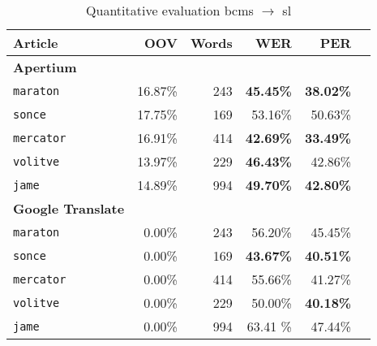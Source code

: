 \begin{table}
\begin{tabular}{lrrrrr}

\textbf{Article} & \textbf{OOV} & \textbf{Words} & \textbf{WER} & \textbf{PER}\\
\hline
\textbf{Apertium} & & & & \\
\hline
\texttt{maraton} & 16.87\% & 243 & \textbf{45.45\%} & \textbf{38.02\%} \\ 
\texttt{sonce} & 17.75\% & 169 & 53.16\% & 50.63\% \\
\texttt{mercator} & 16.91\% & 414& \textbf{42.69\%} & \textbf{33.49\%} \\
\texttt{volitve} & 13.97\% & 229 & \textbf{46.43\%} & 42.86\%\\
\texttt{jame} & 14.89\% & 994 & \textbf{49.70\%} & \textbf{42.80\%} \\
\hline
\textbf{Google Translate} & & & & \\
\hline
\texttt{maraton} & 0.00\% & 243 & 56.20\% & 45.45\% \\ 
\texttt{sonce} & 0.00\% & 169 & \textbf{43.67\%} & \textbf{40.51\%} \\
\texttt{mercator} & 0.00\% & 414& 55.66\% & 41.27\% \\
\texttt{volitve} & 0.00\% & 229 & 50.00\% & \textbf{40.18\%}\\
\texttt{jame} & 0.00\% & 994 & 63.41 \% & 47.44\% \\
\hline
\end{tabular}
\caption{ Quantitative evaluation bcms $\rightarrow$ sl}
\label{table:quantitative1}
\end{table}

